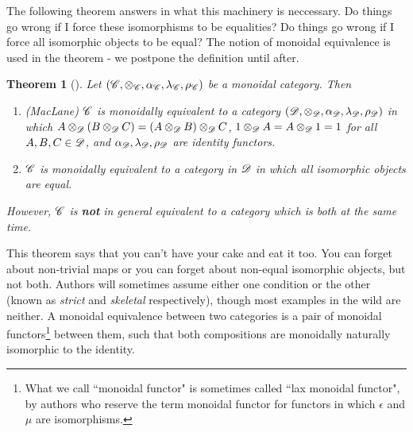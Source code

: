 \documentclass{article}
\newtheorem{theorem}{Theorem}[section]
\theoremstyle{definition}
\numberwithin{figure}{section}
\begin{document}
The following theorem answers in what this machinery is neccessary. Do things go wrong if I force these isomorphisms to be equalities? Do things go wrong if I force all isomorphic objects to be equal? The notion of monoidal equivalence is used in the theorem - we postpone the definition until after.

\begin{theorem}[\cite{hagge2009some}] Let $(\mathscr{C},\otimes_{\mathscr{C}},\alpha_{\mathscr{C}},\lambda_{\mathscr{C}},\rho_{\mathscr{C}})$ be a monoidal category. Then

\begin{enumerate}
\item (MacLane) $\mathscr{C}$ is monoidally equivalent to a category $(\mathscr{D},\otimes_{\mathscr{D}},\alpha_{\mathscr{D}},\lambda_{\mathscr{D}},\rho_{\mathscr{D}})$ in which $A\otimes_{\mathscr{D}} (B\otimes_{\mathscr{D}} C)=(A\otimes_{\mathscr{D}} B)\otimes_{\mathscr{D}} C$, $1\otimes_{\mathscr{D}} A=A\otimes_{\mathscr{D}} 1=1$ for all $A,B,C\in \mathscr{D}$, and $\alpha_{\mathscr{D}},\lambda_{\mathscr{D}},\rho_{\mathscr{D}}$ are identity functors.

\item $\mathscr{C}$ is monoidally equivalent to a category in $\mathscr{D}$ in which all isomorphic objects are equal.
\end{enumerate}

However, $\mathscr{C}$ is \textbf{not} in general equivalent to a category which is both at the same time.
\end{theorem}

This theorem says that you can't have your cake and eat it too. You can forget about non-trivial maps or you can forget about non-equal isomorphic objects, but not both. Authors will sometimes assume either one condition or the other (known as \textit{strict} and \textit{skeletal} respectively), though most examples in the wild are neither. A monoidal equivalence between two categories is a pair of monoidal functors\footnote{What we call ``monoidal functor" is sometimes called ``lax monoidal functor", by authors who reserve the term monoidal functor for functors in which $\epsilon$ and $\mu$ are isomorphisms.} between them, such that both compositions are monoidally naturally isomorphic to the identity.
\end{document}
